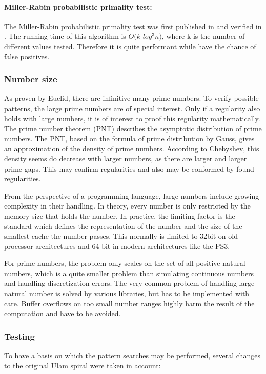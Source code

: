\paragraph{Miller-Rabin probabilistic primality test:}
The Miller-Rabin probabilistic primality test was first published in \cite{MRPT} and verified in \cite{MRVer}. The running time of this algorithm is $O(k$ $log^{3} n)$, where k is the number of different values tested. Therefore it is quite performant while have the chance of false positives.

\subsubsection{Number size}
\label{sec:number_size}
As proven by Euclid, there are infinitive many prime numbers. To verify possible patterns, the large prime numbers are of special interest. Only if a regularity also holds with large numbers, it is of interest to proof this regularity mathematically.
The prime number theorem (PNT) describes the asymptotic distribution of prime numbers. The PNT, based on the formula of prime distribution by Gauss, gives an approximation of the density of prime numbers. According to Chebyshev, this density seems do decrease with larger numbers, as there are larger and larger prime gaps. This may confirm regularities and also may be conformed by found regularities.

From the perspective of a programming language, large numbers include growing complexity in their handling. In theory, every number is only restricted by the memory size that holds the number. In practice, the limiting factor is the standard which defines the representation of the number and the size of the smallest cache the number passes. This normally is limited to 32bit on old processor architectures and 64 bit in modern architectures like the PS3.

For prime numbers, the problem only scales on the set of all positive natural numbers, which is a quite smaller problem than simulating continuous numbers and handling discretization errors. The  very common problem of handling large natural number is solved by various libraries, but has to be implemented with care. Buffer overflows on too small number ranges highly harm the result of the computation and have to be avoided.

\subsubsection{Testing}
\label{sec:tests}
To have a basis on which the pattern searches may be performed, several changes to the original Ulam spiral were taken in account:

